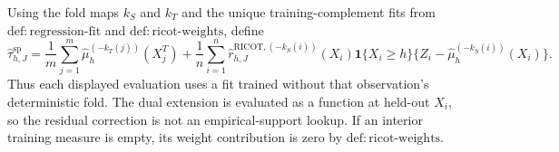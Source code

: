 Using the fold maps \(k_S\) and \(k_T\) and the unique training-complement fits from \(\mathrm{def:regression\text{-}fit}\) and \(\mathrm{def:ricot\text{-}weights}\), define \[\widehat\tau^{\mathrm{sp}}_{h,J}=\frac1m\sum_{j=1}^m\widehat\mu_h^{(-k_T(j))}(X_j^T)+\frac1n\sum_{i=1}^n\widehat r^{\mathrm{RICOT},(-k_S(i))}_{h,J}(X_i)\mathbf 1\{X_i\ge h\}\{Z_i-\widehat\mu_h^{(-k_S(i))}(X_i)\}.\] Thus each displayed evaluation uses a fit trained without that observation's deterministic fold. The dual extension is evaluated as a function at held-out \(X_i\), so the residual correction is not an empirical-support lookup. If an interior training measure is empty, its weight contribution is zero by \(\mathrm{def:ricot\text{-}weights}\).